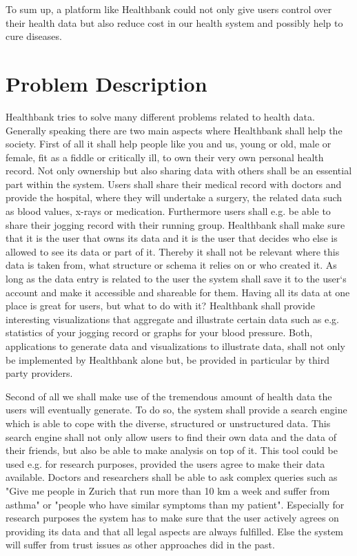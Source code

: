 To sum up, a platform like Healthbank could not only give users control over their health data but also reduce cost in our health system and possibly help to cure diseases.


\section{Problem Description}

Healthbank tries to solve many different problems related to health data. Generally speaking there are two main aspects where Healthbank shall help the society. \newline
First of all it shall help people like you and us, young or old, male or female, fit as a fiddle or critically ill, to own their very own personal health record. Not only ownership but also sharing data with others shall be an essential part within the system. Users shall share their medical record with doctors and provide the hospital, where they will undertake a surgery, the related data such as blood values, x-rays or medication. Furthermore users shall e.g. be able to share their jogging record with their running group. Healthbank shall make sure that it is the user that owns its data and it is the user that decides who else is allowed to see its data or part of it. Thereby it shall not be relevant where this data is taken from, what structure or schema it relies on or who created it. As long as the data entry is related to the user the system shall save it to the user`s account and make it accessible and shareable for them. \newline
Having all its data at one place is great for users, but what to do with it? Healthbank shall provide interesting visualizations that aggregate and illustrate certain data such as e.g. statistics of your jogging record or graphs for your blood pressure. Both, applications to generate data and visualizations to illustrate data, shall not only be implemented by Healthbank alone but, be provided in particular by third party providers.

Second of all we shall make use of the tremendous amount of health data the users will eventually generate. To do so, the system shall provide a search engine which is able to cope with the diverse, structured or unstructured data. This search engine shall not only allow users to find their own data and the data of their friends, but also be able to make analysis on top of it. This tool could be used e.g. for research purposes, provided the users agree to make their data available. Doctors and researchers shall be able to ask complex queries such as "Give me people in Zurich that run more than 10 km a week and suffer from asthma" or "people who have similar symptoms than my patient". Especially for research purposes the system has to make sure that the user actively agrees on providing its data and that all legal aspects are always fulfilled. Else the system will suffer from trust issues as other approaches did in the past.


